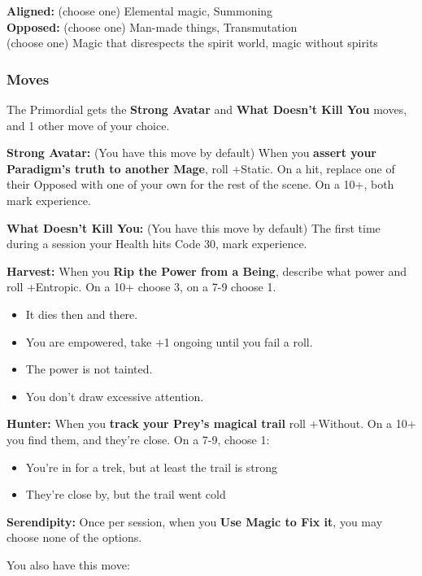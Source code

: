\documentclass[
]{article}
\providecommand{\tightlist}{%
  \setlength{\itemsep}{0pt}\setlength{\parskip}{0pt}}
\begin{document}
\textbf{Aligned:} (choose one) Elemental magic, Summoning\\
\textbf{Opposed:} (choose one) Man-made things, Transmutation\\
(choose one) Magic that disrespects the spirit world, magic without
spirits

\hypertarget{moves-5}{%
\subsubsection{Moves}\label{moves-5}}

The Primordial gets the \textbf{Strong Avatar} and \textbf{What Doesn't
Kill You} moves, and 1 other move of your choice.

\textbf{Strong Avatar:} (You have this move by default) When you
\textbf{assert your Paradigm's truth to another Mage}, roll +Static. On
a hit, replace one of their Opposed with one of your own for the rest of
the scene. On a 10+, both mark experience.

\textbf{What Doesn't Kill You:} (You have this move by default) The
first time during a session your Health hits Code 30, mark experience.

\textbf{Harvest:} When you \textbf{Rip the Power from a Being}, describe
what power and roll +Entropic. On a 10+ choose 3, on a 7-9 choose 1.

\begin{itemize}
\tightlist
\item
  It dies then and there.
\item
  You are empowered, take +1 ongoing until you fail a roll.
\item
  The power is not tainted.
\item
  You don't draw excessive attention.
\end{itemize}

\textbf{Hunter:} When you \textbf{track your Prey's magical trail} roll
+Without. On a 10+ you find them, and they're close. On a 7-9, choose 1:

\begin{itemize}
\tightlist
\item
  You're in for a trek, but at least the trail is strong
\item
  They're close by, but the trail went cold
\end{itemize}

\textbf{Serendipity:} Once per session, when you \textbf{Use Magic to
Fix it}, you may choose none of the options.

You also have this move:
\end{document}
